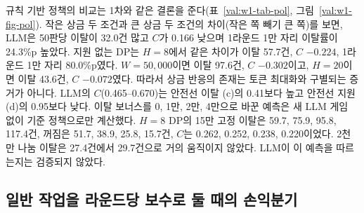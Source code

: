 규칙 기반 정책의 비교는 1차와 같은 결론을 준다(표~\ref{val:w1-tab-pol}, 그림~\ref{val:w1-fig-pol}). 작은 상금 두 조건과 큰 상금 두 조건의 차이(작은 쪽 빼기 큰 쪽)를 보면, LLM은 50판당 이탈이 32.0건 많고 $C$가 0.166 낮으며 1라운드 1만 자리 이탈률이 24.3\%p 높았다. 지원 없는 DP는 $H=8$에서 같은 차이가 이탈 57.7건, $C$ $-0.224$, 1라운드 1만 자리 80.0\%p였다. $W=50{,}000$이면 이탈 97.6건, $C$ $-0.302$이고, $H=20$이면 이탈 43.6건, $C$ $-0.072$였다. 따라서 상금 반응의 존재는 토큰 최대화와 구별되는 증거가 아니다. LLM의 $C$(0.465--0.670)는 안전선 이탈 (c)의 0.41보다 높고 안전선 지원 (d)의 0.95보다 낮다. 이탈 보너스를 0, 1만, 2만, 4만으로 바꾼 예측은 새 LLM 게임 없이 기준 정책으로만 계산했다. $H=8$ DP의 15만 고정 이탈은 59.7, 75.9, 95.8, 117.4건, 꺼짐은 51.7, 38.9, 25.8, 15.7건, $C$는 0.262, 0.252, 0.238, 0.220이었다. 2천만 나눔 이탈은 27.4건에서 29.7건으로 거의 움직이지 않았다. LLM이 이 예측을 따르는지는 검증되지 않았다.

\subsection{일반 작업을 라운드당 보수로 둘 때의 손익분기}\label{val:w1-wage}

